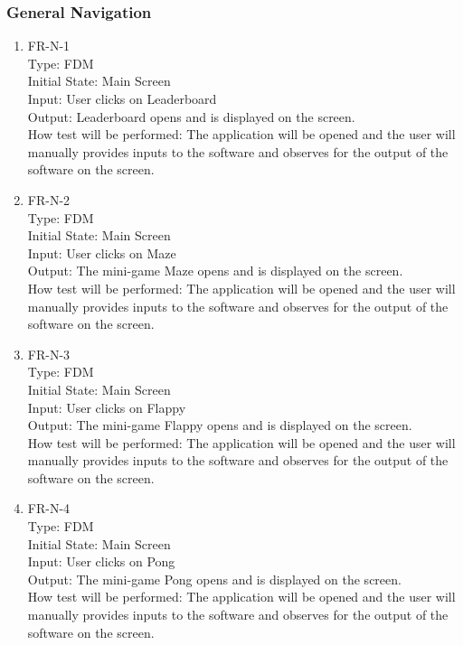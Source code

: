 \documentclass[12pt, titlepage]{article}
\begin{document}
\subsubsection{General Navigation}

\begin{enumerate}

\item{FR-N-1\\}
Type: FDM\\
Initial State: Main Screen\\
Input: User clicks on Leaderboard\\
Output: Leaderboard opens and is displayed on the screen.\\
How test will be performed: The application will be opened and the user will manually provides inputs to the software and observes for the output of the software on the screen.\\

\item{FR-N-2\\}
Type: FDM\\
Initial State: Main Screen\\
Input: User clicks on Maze\\
Output: The mini-game Maze opens and is displayed on the screen.\\
How test will be performed: The application will be opened and the user will manually provides inputs to the software and observes for the output of the software on the screen.\\

\item{FR-N-3\\}
Type: FDM\\
Initial State: Main Screen\\
Input: User clicks on Flappy\\
Output: The mini-game Flappy opens and is displayed on the screen.\\
How test will be performed: The application will be opened and the user will manually provides inputs to the software and observes for the output of the software on the screen.\\

\item{FR-N-4\\}
Type: FDM\\
Initial State: Main Screen\\
Input: User clicks on Pong\\
Output: The mini-game Pong opens and is displayed on the screen.\\
How test will be performed: The application will be opened and the user will manually provides inputs to the software and observes for the output of the software on the screen.\\


\end{enumerate}
\end{document}
